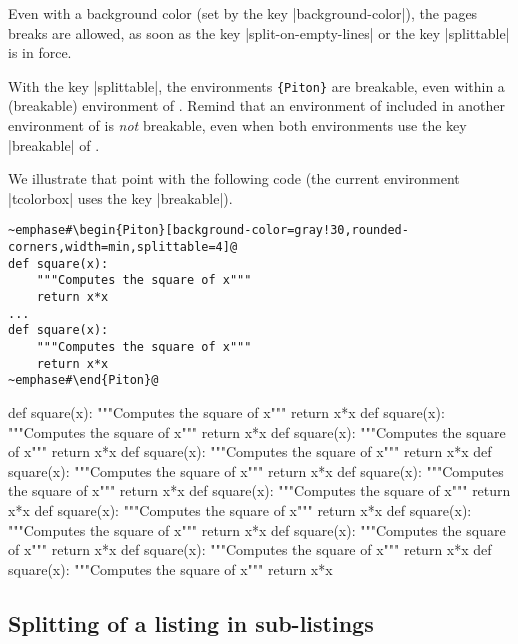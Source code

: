 \documentclass{article}
\begin{document}
\medskip
\begin{tcolorbox}[breakable]
Even with a background color (set by the key |background-color|), the pages
breaks are allowed, as soon as the key |split-on-empty-lines| or the key
|splittable| is in force.

\medskip
With the key |splittable|, the environments
\texttt{\{Piton\}} are breakable, even within a (breakable) environment of
. Remind that an environment of  included in
another environment of  is \emph{not} breakable, even when both
environments use the key |breakable| of .

\medskip
We illustrate that point with the following code (the current environment
|{tcolorbox}| uses the key |breakable|).

\begin{Verbatim}
~emphase#\begin{Piton}[background-color=gray!30,rounded-corners,width=min,splittable=4]@
def square(x):
    """Computes the square of x"""
    return x*x
...
def square(x):
    """Computes the square of x"""
    return x*x
~emphase#\end{Piton}@
\end{Verbatim}

\bigskip
\begin{Piton}[background-color=gray!30,rounded-corners,width=min,splittable=4]
def square(x):
    """Computes the square of x"""
    return x*x
def square(x):
    """Computes the square of x"""
    return x*x
def square(x):
    """Computes the square of x"""
    return x*x
def square(x):
    """Computes the square of x"""
    return x*x 
def square(x):
    """Computes the square of x"""
    return x*x
def square(x):
    """Computes the square of x"""
    return x*x
def square(x):
    """Computes the square of x"""
    return x*x
def square(x):
    """Computes the square of x"""
    return x*x
def square(x):
    """Computes the square of x"""
    return x*x
def square(x):
    """Computes the square of x"""
    return x*x
def square(x):
    """Computes the square of x"""
    return x*x
def square(x):
    """Computes the square of x"""
    return x*x
\end{Piton}

\end{tcolorbox}

\subsection{Splitting of a listing in sub-listings}
\end{document}

